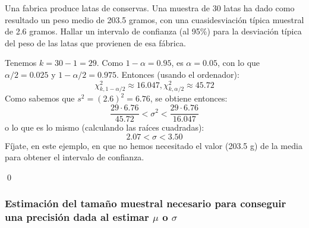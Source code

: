 \begin{ejemplo}
\label{cap06:ejem:IntervaloConfianzaVarianzaLatasConserva}
    Una fabrica produce latas de conservas. Una muestra de 30 latas ha dado como resultado un peso
    medio de 203.5 gramos, con una cuasidesviación típica muestral de 2.6 gramos. Hallar un intervalo de confianza (al 95\%) para la desviación típica del peso de las latas que provienen de esa fábrica.

   Tenemos $k=30-1=29$. Como $1-\alpha=0.95$, es $\alpha=0.05$, con lo que $\alpha/2=0.025$ y
   $1-\alpha/2=0.975$. Entonces (usando el ordenador):
   \[\chi^2_{k,1-\alpha/2}\approx 16.047, \chi^2_{k,\alpha/2}\approx 45.72\]
   Como sabemos que $s^2=(2.6)^2=6.76$, se obtiene entonces:
   \[\dfrac{29\cdot 6.76}{45.72}<\sigma^2<\dfrac{29\cdot 6.76}{16.047}\]
   o lo que es lo mismo (calculando las raíces cuadradas):
   \[ 2.07<\sigma<3.50\]
   Fíjate, en este ejemplo, en que no hemos necesitado el valor (203.5 g) de la media para obtener
   el intervalo de confianza.

   \qed
\end{ejemplo}

\subsubsection{Estimación del tamaño muestral necesario para conseguir una precisión dada al estimar $\mu$ o $\sigma$}
\label{cap06:subsubsec:EstimacionTamannoMuestralParaMediaUsandoIntConfSigma}

